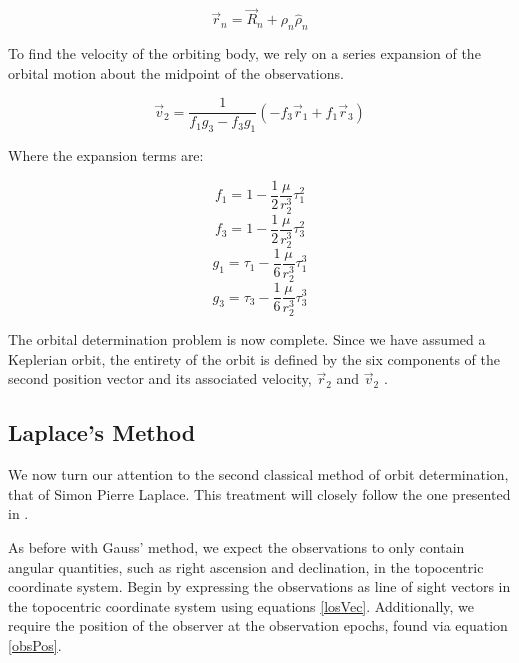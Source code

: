 \documentclass[11pt,twoside,letterpaper]{article}
\begin{document}
  \begin{equation}
    \vec{r}_n = \vec{R}_n + \rho_n{\hat{\rho}}_n
  \end{equation}

  To find the velocity of the orbiting body, we rely on a series
  expansion of the orbital motion about the midpoint of the
  observations.

  \begin{equation}
    \vec{v}_2 = \frac{1}{f_1g_3 - f_3g_1}\left(-f_3\vec{r}_1 + f_1\vec{r}_3\right)
  \end{equation}

  Where the expansion terms are:

  \begin{equation}
    f_1 = 1 - \frac{1}{2}\frac{\mu}{r_2^3}\tau_1^2
  \end{equation}
  \begin{equation}
    f_3 = 1 - \frac{1}{2}\frac{\mu}{r_2^3}\tau_3^2
  \end{equation}
  \begin{equation}
    g_1 = \tau_1 - \frac{1}{6}\frac{\mu}{r_2^3}\tau_1^3
  \end{equation}
  \begin{equation}    
    g_3 = \tau_3 - \frac{1}{6}\frac{\mu}{r_2^3}\tau_3^3
  \end{equation}

  The orbital determination problem is now complete. Since we have
  assumed a Keplerian orbit, the entirety of the orbit is defined by
  the six components of the second position vector and its associated
  velocity, $\vec{r}_2$ and $\vec{v}_2$ \cite{kluever_2018}.

  \subsection{Laplace's Method}
  We now turn our attention to the second classical method of orbit
  determination, that of Simon Pierre Laplace. This treatment will
  closely follow the one presented in \cite{bate_mueller_white_2015}.

  As before with Gauss' method, we expect the observations to only
  contain angular quantities, such as right ascension and declination,
  in the topocentric coordinate system. Begin by expressing the
  observations as line of sight vectors in the topocentric coordinate
  system using equations \ref{losVec}. Additionally, we require the
  position of the observer at the observation epochs, found via
  equation \ref{obsPos}.
\end{document}
